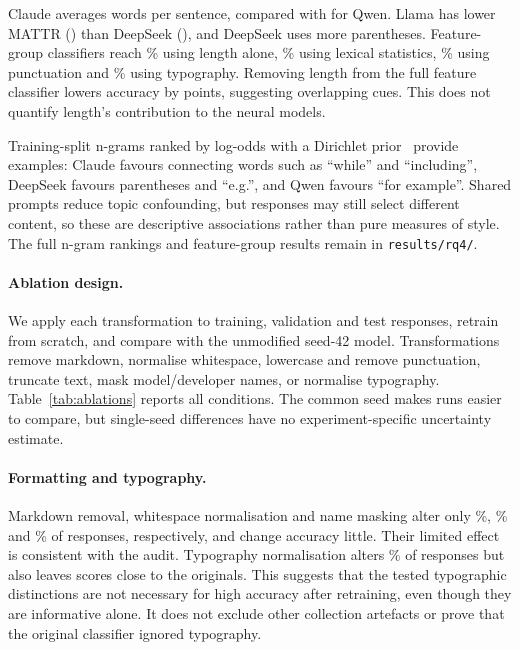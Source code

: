 \documentclass[11pt]{article}
\begin{document}
Claude averages \WordsPerSentenceClaude{} words per sentence, compared with \WordsPerSentenceQwen{}
for Qwen. Llama has lower MATTR (\MattrLlama{}) than DeepSeek (\MattrDeepSeek{}), and DeepSeek uses
more parentheses. Feature-group classifiers reach \FeatOnlyLength\% using length alone,
\FeatOnlyLexical\% using lexical statistics, \FeatOnlyPunctuation\% using punctuation and
\FeatOnlyTypography\% using typography. Removing length from the full feature classifier lowers accuracy
by \FeatLossLength{} points, suggesting overlapping cues. This does not quantify length's contribution
to the neural models.

Training-split n-grams ranked by log-odds with a Dirichlet prior~\cite{monroe2008} provide examples:
Claude favours connecting words such as ``while'' and ``including'', DeepSeek favours parentheses and
``e.g.'', and Qwen favours ``for example''. Shared prompts reduce topic confounding, but responses may
still select different content, so these are descriptive associations rather than pure measures of style.
The full n-gram rankings and feature-group results remain in \texttt{results/rq4/}.

\paragraph{Ablation design.} We apply each transformation to training, validation and test responses,
retrain from scratch, and compare with the unmodified seed-42 model. Transformations remove markdown,
normalise whitespace, lowercase and remove punctuation, truncate text, mask model/developer names, or
normalise typography. Table~\ref{tab:ablations} reports all conditions. The common seed makes runs easier
to compare, but single-seed differences have no experiment-specific uncertainty estimate.

\begin{table}[!htb]
\centering\small
\caption{RQ4 retraining ablations, seed 42. Accuracy is in percent; $\Delta$ is the change from the
unmodified seed-42 model in percentage points.}
\label{tab:ablations}

\end{table}

\paragraph{Formatting and typography.} Markdown removal, whitespace normalisation and name masking
alter only \AblStripMarkdownChanged\%, \AblNormalizeWhitespaceChanged\% and \AblMaskSelfIdChanged\%
of responses, respectively, and change accuracy little. Their limited effect is consistent with the audit.
Typography normalisation alters \AblNormalizeTypographyChanged\% of responses but also leaves scores
close to the originals. This suggests that the tested typographic distinctions are not necessary for high
accuracy after retraining, even though they are informative alone. It does not exclude other collection
artefacts or prove that the original classifier ignored typography.
\end{document}
